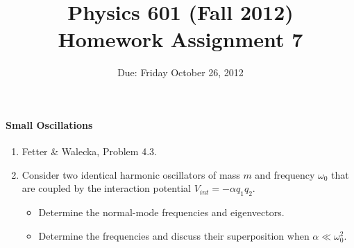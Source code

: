 \documentclass[letterpaper,11pt]{article}
\title{Physics 601 (Fall 2012) \\ Homework Assignment 7}
\date{Due: Friday October 26, 2012}
\begin{document}
\maketitle

\paragraph*{Small Oscillations}
\begin{enumerate}
 \item Fetter \& Walecka, Problem 4.3.
 \item Consider two identical harmonic oscillators of mass $m$ and frequency $\omega_0$ that are coupled by the interaction potential $V_{int} = -\alpha q_1 q_2$.
 \begin{itemize}
  \item Determine the normal-mode frequencies and eigenvectors.
  \item Determine the frequencies and discuss their superposition when $\alpha \ll \omega_0^2$.
 \end{itemize}
\end{enumerate}
\end{document}
